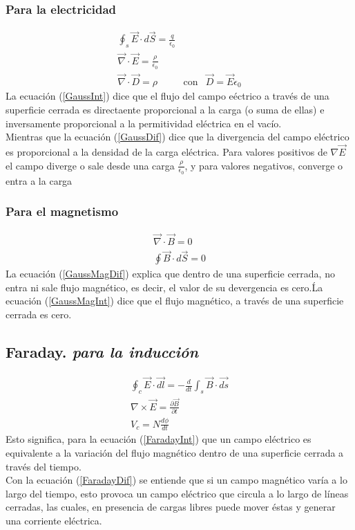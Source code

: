 \documentclass[12pt,spanish,lettersize]{article}
\begin{document}
\subsubsection{Para la electricidad}
\begin{eqnarray}
\oint_{s}\overrightarrow{E}\cdot d\overrightarrow{S}=\frac{q}{\epsilon_0}\label{GaussInt}\\
\overrightarrow{\nabla}\cdot\overrightarrow{E}=\frac{\rho}{\epsilon_0}\label{GaussDif}\\
\nonumber \overrightarrow{\nabla}\cdot\overrightarrow{D}= \rho & \textrm{con} & \overrightarrow{D} = \overrightarrow{E}\epsilon_0
\end{eqnarray}
La ecuaci\'on (\ref{GaussInt}) dice que el flujo del campo e\'ectrico a trav\'es de una superficie cerrada es directaente proporcional a la carga (o suma de ellas) e inversamente proporcional a la permitividad el\'ectrica en el vac\'io.\\
Mientras que la ecuaci\'on (\ref{GaussDif}) dice que la divergencia del campo el\'ectrico es proporcional a la densidad de la carga el\'ectrica. Para valores positivos de $\nabla\overrightarrow{E}$ el campo diverge o sale desde una carga $\frac{\rho}{\epsilon_0}$, y para valores negativos, converge o entra a la carga

\subsubsection{Para el magnetismo}
\begin{eqnarray}
\overrightarrow{\nabla}\cdot\overrightarrow{B} = 0\label{GaussMagDif}\\
\oint\overrightarrow{B}\cdot d\overrightarrow{S}=0\label{GaussMagInt}
\end{eqnarray}
La ecuaci\'on (\ref{GaussMagDif}) explica que dentro de una superficie cerrada, no entra ni sale flujo magn\'etico, es decir, el valor de su devergencia es cero.\'
La ecuaci\'on (\ref{GaussMagInt}) dice que el flujo magn\'etico, a trav\'es de una superficie cerrada es cero.

\subsection{Faraday. \emph{para la inducci\'on}}
\begin{eqnarray}
\oint_c \overrightarrow{E}\cdot \overrightarrow{dl} = -\frac{d}{dt}\int_s\overrightarrow{B}\cdot \overrightarrow{ds}\label{FaradayInt}\\
\nabla\times\overrightarrow{E}=\frac{\partial \overrightarrow{B}}{\partial t}\label{FaradayDif}\\
V_c=N\frac{d\phi}{dt}
\end{eqnarray}
Esto significa, para la ecuaci\'on (\ref{FaradayInt}) que un campo el\'ectrico es equivalente a la variaci\'on del flujo magn\'etico dentro de una superficie cerrada a trav\'es del tiempo.\\
Con la ecuaci\'on (\ref{FaradayDif}) se entiende que si un campo magn\'etico var\'ia a lo largo del tiempo, esto provoca un campo el\'ectrico que circula a lo largo de l\'ineas cerradas, las cuales, en presencia de cargas libres puede mover \'estas y generar una corriente el\'ectrica.
\end{document}
